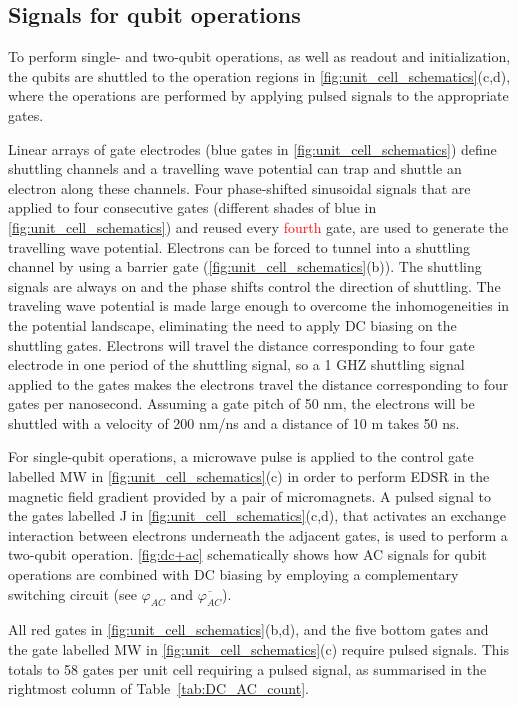 \documentclass[aps,prl,reprint,superscriptaddress,floatfix]{revtex4-1}
\begin{document}
\subsection{Signals for qubit operations}

To perform single- and two-qubit operations, as well as readout and initialization, the qubits are shuttled to the operation regions in \autoref{fig:unit_cell_schematics}(c,d), where the operations are performed by applying pulsed signals to the appropriate gates.

Linear arrays of gate electrodes (blue gates in \autoref{fig:unit_cell_schematics}) define shuttling channels and a travelling wave potential can trap and shuttle an electron along these channels.
Four phase-shifted sinusoidal signals that are applied to four consecutive gates (different shades of blue in \autoref{fig:unit_cell_schematics}) and reused every \textcolor{red}{fourth} gate, are used to generate the travelling wave potential.
Electrons can be forced to tunnel into a shuttling channel by using a barrier gate (\autoref{fig:unit_cell_schematics}(b)).
The shuttling signals are always on and the phase shifts control the direction of shuttling.
The traveling wave potential is made large enough to overcome the inhomogeneities in the potential landscape, eliminating the need to apply DC biasing on the shuttling gates.
Electrons will travel the distance corresponding to four gate electrode in one period of the shuttling signal, so a 1 GHZ shuttling signal applied to the gates makes the electrons travel the distance corresponding to four gates per nanosecond.
Assuming a gate pitch of 50 nm, the electrons will be shuttled with a velocity of 200 nm/ns and a distance of 10 \textmu m takes 50 ns.

For single-qubit operations, a microwave pulse is applied to the control gate labelled MW in \autoref{fig:unit_cell_schematics}(c) in order to perform EDSR in the magnetic field gradient provided by a pair of micromagnets.
A pulsed signal to the gates labelled J in \autoref{fig:unit_cell_schematics}(c,d), that activates an exchange interaction between electrons underneath the adjacent gates, is used to perform a two-qubit operation.
\autoref{fig:dc+ac} schematically shows how AC signals for qubit operations are combined with DC biasing by employing a complementary switching circuit (see $\varphi_{AC}$ and $\overline{\varphi_{AC}}$).

All red gates in \autoref{fig:unit_cell_schematics}(b,d), and the five bottom gates and the gate labelled MW in \autoref{fig:unit_cell_schematics}(c) require pulsed signals.
This totals to 58 gates per unit cell requiring a pulsed signal, as summarised in the rightmost column of Table~\ref{tab:DC_AC_count}.
\end{document}
